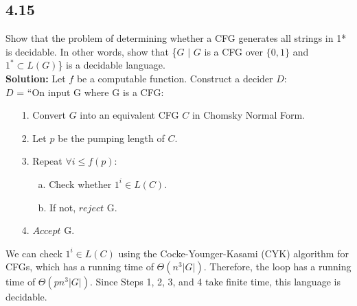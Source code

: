 \subsection*{4.15} Show that the problem of determining whether a CFG generates all strings in 1* is decidable. In other words, show that \{\textlangle{}$G$\textrangle{} $|$ $G$ is a CFG over $\{0, 1\}$ and $1^* \subset L(G)$\} is a decidable language. 
\\
\textbf{Solution:} Let $f$ be a computable function. Construct a decider $D$:
\\
$D$ = ``On input \textlangle{}G\textrangle{} where G is a CFG:
\begin{enumerate}
\itemsep0em
\item[1.]Convert $G$ into an equivalent CFG $C$ in Chomsky Normal Form.
\item[2.]Let $p$ be the pumping length of $C$.
\item[3.]Repeat $\forall i \le f(p)$:
\begin{enumerate}
\item[a.]Check whether $1^i \in L(C)$.
\item[b.]If not, $reject$ \textlangle{}G\textrangle{}.
\end{enumerate}
\item[4.]$Accept$ \textlangle{}G\textrangle{}.
\end{enumerate}
We can check $1^i \in L(C)$ using the Cocke-Younger-Kasami (CYK) algorithm for CFGs, which has a running time of $\Theta(n^3 |G|)$. Therefore, the loop has a running time of $\Theta(pn^3 |G|)$. Since Steps 1, 2, 3, and 4 take finite time, this language is decidable.


